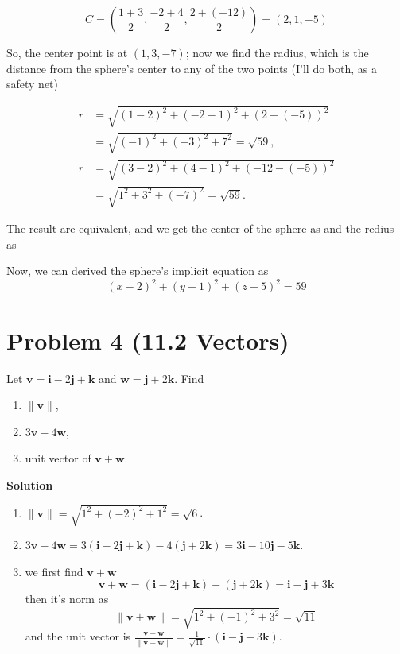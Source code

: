 \documentclass{article}
\newcommand{\solution}{\textbf{\large Solution}}
\theoremstyle{remark}
\begin{document}
  \[
  C = \left(\frac{1+3}{2},\frac{-2+4}{2},\frac{2+(-12)}{2}\right) = (2,1,-5)
  \]

So, the center point is at $(1, 3, -7)$; now we find the radius, which is the distance from the sphere's center to any of the two points (I'll do both, as a safety net)

  \begin{align*}
  r &= \sqrt{(1-2)^2 + (-2-1)^2 + (2-(-5))^2} \\
  &= \sqrt{(-1)^2 + (-3)^2 + 7^2}
  = \sqrt{59}, \\
  r &= \sqrt{(3-2)^2 + (4-1)^2 + (-12-(-5))^2} \\
  &= \sqrt{1^2 + 3^2 + (-7)^2}
  = \sqrt{59}.
  \end{align*}

The result are equivalent, and we get the center of the sphere as  and the redius as 

Now, we can derived the sphere's implicit equation as
    \[
        \boxed{(x - 2)^2 + (y - 1)^2 + (z + 5)^2 = 59}
    \]

\vspace{1em}
\hrulefill

\section*{Problem 4 (11.2 Vectors)}
Let $\mathbf{v} = \mathbf{i} - 2\mathbf{j} + \mathbf{k}$ and $\mathbf{w} = \mathbf{j} + 2\mathbf{k}$. Find
\begin{enumerate}[label=(\alph*)]
    \item $\lVert \mathbf{v} \rVert$,
    \item $3\mathbf{v} - 4\mathbf{w}$,
    \item unit vector of $\mathbf{v} + \mathbf{w}$.
\end{enumerate}

\medskip
\solution

\begin{enumerate}[label=(\alph*)]
    \item $\lVert \mathbf{v} \rVert = \sqrt{1^{2}+(-2)^{2}+1^{2}} = \boxed{\sqrt{6}}$.
    \item $3\mathbf{v}-4\mathbf{w} = 3(\mathbf{i}-2\mathbf{j}+\mathbf{k}) -
  4(\mathbf{j}+2\mathbf{k})
          = \boxed{3\mathbf{i}-10\mathbf{j}-5\mathbf{k}}$.
    \item we first find $\mathbf{v}+\mathbf{w}$
        \[
            \mathbf{v}+\mathbf{w} = (\mathbf{i}-2\mathbf{j}+\mathbf{k}) + (\mathbf{j}+2\mathbf{k})
          = \mathbf{i}-\mathbf{j}+3\mathbf{k}
        \] 
        then it's norm as
          \[
              \lVert \mathbf{v}+\mathbf{w} \rVert = \sqrt{1^{2}+(-1)^{2}+3^{2}} = \sqrt{11}
          \]
          and the unit vector is
          $\displaystyle \frac{\mathbf{v}+\mathbf{w}}{\lVert \mathbf{v}+\mathbf{w} \rVert}
          = \boxed{\frac{1}{\sqrt{11}} \cdot (\mathbf{i}-\mathbf{j}+3\mathbf{k})}$.
  \end{enumerate}
\end{document}
